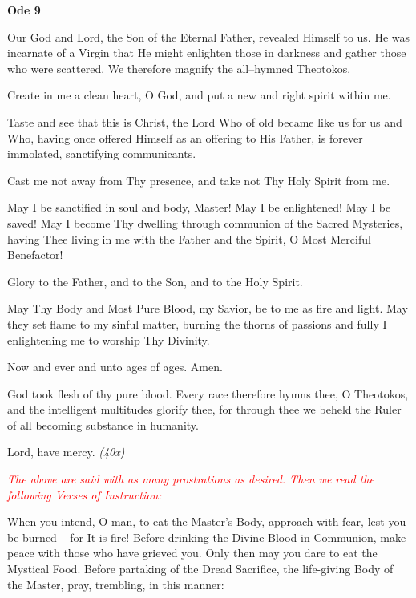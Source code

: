\begin{center}
	\textbf{Ode 9}
\end{center}

\begin{hang}
\noindent{}Our God and Lord, the Son of the Eternal Father, revealed Himself to us. He was incarnate of a Virgin that He might enlighten those in darkness and gather those who were scattered. We therefore magnify the all--hymned Theotokos.

Create in me a clean heart, O God, and put a new and right spirit within me.

Taste and see that this is Christ, the Lord Who of old became like us for us and Who, having once offered Himself as an offering to His Father, is forever immolated, sanctifying communicants.

Cast me not away from Thy presence, and take not Thy Holy Spirit from me.

May I be sanctified in soul and body, Master! May I be enlightened! May I be saved! May I become Thy dwelling through communion of the Sacred Mysteries, having Thee living in me with the Father and the Spirit, O Most Merciful Benefactor!

Glory to the Father, and to the Son, and to the Holy Spirit.

May Thy Body and Most Pure Blood, my Savior, be to me as fire and light. May they set flame to my sinful matter, burning the thorns of passions and fully I enlightening me to worship Thy Divinity.

Now and ever and unto ages of ages. Amen.

God took flesh of thy pure blood. Every race therefore hymns thee, O Theotokos, and the intelligent multitudes glorify thee, for through thee we beheld the Ruler of all becoming substance in humanity.

Lord, have mercy. \textit{(40x)}

\end{hang}

\textcolor{red}{\textit{The above are said with as many prostrations as desired. Then we read the following Verses of Instruction:}}

When you intend, O man, to eat the Master's Body, approach with fear, lest you be burned -- for It is fire! Before drinking the Divine Blood in Communion, make peace with those who have grieved you. Only then
may you dare to eat the Mystical Food. Before partaking of the Dread Sacrifice, the life-giving Body of the Master, pray, trembling, in this manner: 


